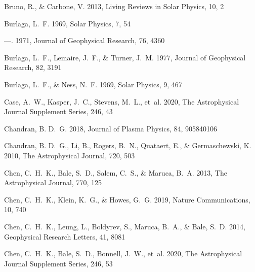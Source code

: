 \documentclass[]{aastex62}
\begin{document}
\begin{thebibliography}{}
{Bruno}, R., \& {Carbone}, V. 2013, Living Reviews in Solar Physics, 10, 2

{Burlaga}, L.~F. 1969, Solar Physics, 7, 54

---. 1971, Journal of Geophysical Research, 76, 4360

{Burlaga}, L.~F., {Lemaire}, J.~F., \& {Turner}, J.~M. 1977, Journal of
  Geophysical Research, 82, 3191

{Burlaga}, L.~F., \& {Ness}, N.~F. 1969, Solar Physics, 9, 467

{Case}, A.~W., {Kasper}, J.~C., {Stevens}, M.~L., {et~al.} 2020, The
  Astrophysical Journal Supplement Series, 246, 43

{Chandran}, B. D.~G. 2018, Journal of Plasma Physics, 84, 905840106

Chandran, B. D.~G., Li, B., Rogers, B.~N., Quataert, E., \& Germaschewski, K.
  2010, The Astrophysical Journal, 720, 503

{Chen}, C.~H.~K., {Bale}, S.~D., {Salem}, C.~S., \& {Maruca}, B.~A. 2013, The
  Astrophysical Journal, 770, 125

{Chen}, C.~H.~K., {Klein}, K.~G., \& {Howes}, G.~G. 2019, Nature
  Communications, 10, 740

{Chen}, C.~H.~K., {Leung}, L., {Boldyrev}, S., {Maruca}, B.~A., \& {Bale},
  S.~D. 2014, Geophysical Research Letters, 41, 8081

{Chen}, C.~H.~K., {Bale}, S.~D., {Bonnell}, J.~W., {et~al.} 2020, The
  Astrophysical Journal Supplement Series, 246, 53


\end{thebibliography}
\end{document}
